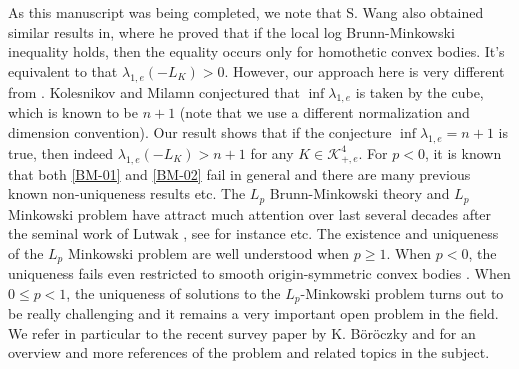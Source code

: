 \documentclass[reqno]{amsart}
\theoremstyle{remark}
\def\cK{{\mathcal K}}
\theoremstyle{plain}
\begin{document}
As this manuscript was being completed, we note that S. Wang also obtained similar results in\cite{Wang25}, where he proved that if the local log Brunn-Minkowski inequality holds, then the equality occurs only for homothetic convex bodies.  It's equivalent to that $\lambda_{1,e}(-L_K)>0$. However, our approach here is very different from \cite{Wang25}.  
Kolesnikov and Milamn \cite[Proposition 5.14]{KM01} conjectured that $\inf \lambda_{1, e}$ is taken by the cube,  which is known to be $n+1$ \cite[Theorem 10.2]{KM01} (note that we use a different normalization and dimension convention).  Our result shows that if the conjecture $\inf \lambda_{1, e}=n+1$ is true, then indeed $\lambda_{1, e}(-L_K)>n+1$ for any $K\in \cK^4_{+, e}$. 
 For $p<0$, it is known that both \eqref{BM-01} and \eqref{BM-02} fail in general and there are many previous known non-uniqueness results \cite{Stancu02, Andrews03, CW06, JLW, HLW16, Li19, LLL22, KM01} etc. The $L_p$ Brunn-Minkowski theory and $L_p$ Minkowski problem have attract much attention over last several decades after the seminal work of Lutwak \cite{Lut95}, see for instance \cite{BBCY, BHZ, BLYZ02, CLZ, CW06, HLYZ, HLX, LYZ, Stancu01, U, Zhu01, Zhu02} etc. 
The existence and uniqueness of the $L_p$ Minkowski problem are well understood when $p\geq 1$. When $p<0$, the uniqueness fails even restricted to smooth origin-symmetric convex bodies \cite{JLW}.  When $0\leq p<1$,  the uniqueness of solutions to the $L_p$-Minkowski problem turns out to be really challenging and it remains a very important open problem in the field.
We refer in particular to the recent survey paper by K. B\"or\"oczky \cite{B24} and \cite{KM01, Milman23} for an overview and more references of the problem and related topics in the subject. 
\end{document}
